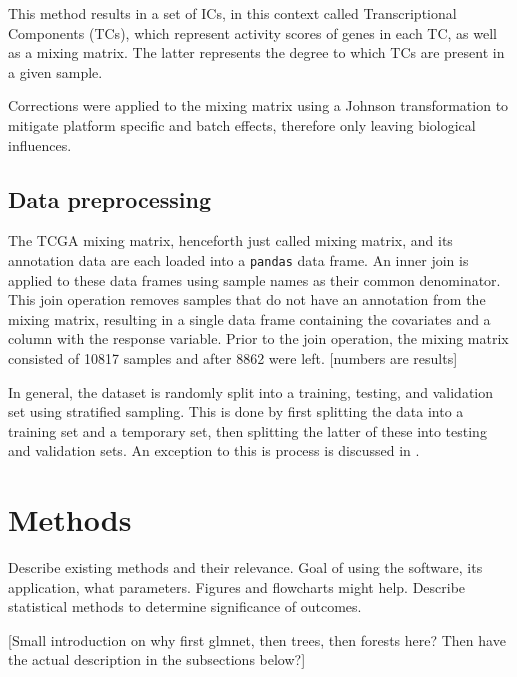 This method results in a set of ICs, in this context called Transcriptional Components (TCs), which represent activity scores of genes in each TC, as well as a mixing matrix.
The latter represents the degree to which TCs are present in a given sample.

Corrections were applied to the mixing matrix using a Johnson transformation to mitigate platform specific and batch effects, therefore only leaving biological influences.





\subsection{Data preprocessing}

The TCGA mixing matrix, henceforth just called mixing matrix, and its annotation data are each loaded into a \verb|pandas| data frame.
An inner join is applied to these data frames using sample names as their common denominator.
This join operation removes samples that do not have an annotation from the mixing matrix, resulting in a single data frame containing the covariates and a column with the response variable.
Prior to the join operation, the mixing matrix consisted of 10817 samples and after 8862 were left. [numbers are results]

In general, the dataset is randomly split into a training, testing, and validation set using stratified sampling.
This is done by first splitting the data into a training set and a temporary set, then splitting the latter of these into testing and validation sets.
An exception to this is process is discussed in .







\section{Methods}
Describe existing methods and their relevance.
Goal of using the software, its application, what parameters.
Figures and flowcharts might help.
Describe statistical methods to determine significance of outcomes.

[Small introduction on why first glmnet, then trees, then forests here?
Then have the actual description in the subsections below?]







